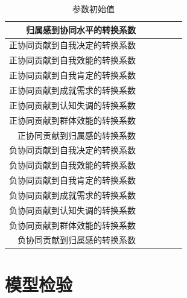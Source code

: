\begin{table}[htb]
\begin{tabular}{|r|r|r|r|r|r|}
\hline
归属感到协同水平的转换系数 &            &            &            &            &            \\
\hline
正协同贡献到自我决定的转换系数 &            &            &            &            &            \\
\hline
正协同贡献到自我效能的转换系数 &            &            &            &            &            \\
\hline
正协同贡献到自我肯定的转换系数 &            &            &            &            &            \\
\hline
正协同贡献到成就需求的转换系数 &            &            &            &            &            \\
\hline
正协同贡献到认知失调的转换系数 &            &            &            &            &            \\
\hline
正协同贡献到群体效能的转换系数 &            &            &            &            &            \\
\hline
正协同贡献到归属感的转换系数 &            &            &            &            &            \\
\hline
负协同贡献到自我决定的转换系数 &            &            &            &            &            \\
\hline
负协同贡献到自我效能的转换系数 &            &            &            &            &            \\
\hline
负协同贡献到自我肯定的转换系数 &            &            &            &            &            \\
\hline
负协同贡献到成就需求的转换系数 &            &            &            &            &            \\
\hline
负协同贡献到认知失调的转换系数 &            &            &            &            &            \\
\hline
负协同贡献到群体效能的转换系数 &            &            &            &            &            \\
\hline
负协同贡献到归属感的转换系数 &            &            &            &            &            \\
\hline
\end{tabular}  

  \caption{\small{参数初始值}}
  \label{tab:initail-value}
\end{table}

\section{模型检验}

